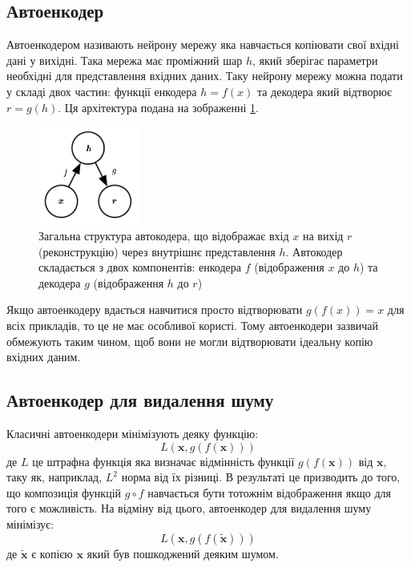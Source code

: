 \documentclass[14pt,a4paper]{extarticle}
\newcounter{e}
\numberwithin{equation}{section}
\numberwithin{figure}{section}
\begin{document}
	\subsection{Автоенкодер}
	
	Автоенкодером називають нейрону мережу яка навчається копіювати свої вхідні дані у вихідні. Така мережа має проміжний шар $h$, який зберігає параметри необхідні для представлення вхідних даних. Таку нейрону мережу можна подати у складі двох частин: функції енкодера $h = f(x)$ та декодера який відтворює $r = g(h)$. Ця архітектура подана на зображенні \ref*{fig:autoencoder-graph}.
	\begin{figure}[H]
		\centering
		\includegraphics[width=0.3\textwidth]{resources/autoencoder_graph.png}
		\caption{Загальна структура автокодера, що відображає вхід $x$ на вихід $r$ (реконструкцію) через внутрішнє представлення $h$. Автокодер складається з двох компонентів: енкодера $f$ (відображення $x$ до $h$) та декодера $g$ (відображення $h$ до $r$) \cite{Goodfellow-et-al-2016}} 
		\label{fig:autoencoder-graph}
	\end{figure}
	Якщо автоенкодеру вдається навчитися просто відтворювати $g(f(x)) = x$ для всіх прикладів, то це не має особливої користі. Тому автоенкодери зазвичай обмежують таким чином, щоб вони не могли відтворювати ідеальну копію вхідних даним. 
		
	\subsection{Автоенкодер для видалення шуму}
	Класичні автоенкодери мінімізують деяку функцію:
	\begin{equation}
		L(\boldsymbol{x}, g(f(\boldsymbol{x})))
	\end{equation}
	де $L$ це штрафна функція яка визначає відмінність функції $g(f(\boldsymbol{x}))$ від $\boldsymbol{x}$, таку як, наприклад,  $L^{2}$ норма від їх різниці. В результаті це призводить до того, що композиція функцій $g \circ f$ навчається бути тотожнім відображення якщо для того є можливість. На відміну від цього, автоенкодер для видалення шуму мінімізує:
	\begin{equation}
		L(\boldsymbol{x}, g(f(\tilde{\boldsymbol{x}})))
	\end{equation}
	де $\tilde{\boldsymbol{x}}$ є копією $\boldsymbol{x}$ який був пошкоджений деяким шумом. 
		
\end{document}
